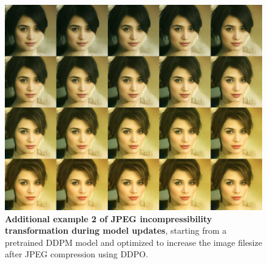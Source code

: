 \begin{appendixs}
        \begin{figure}
            \centering
            \includegraphics[scale=1.40]{img/results/incompressibility_28.png}
            \vspace{-0pt}  %
            \captionsetup{width=\textwidth} %
            \caption{\textbf{Additional example 2 of JPEG incompressibility transformation during model updates}, starting from a pretrained DDPM model and optimized to increase the image filesize after JPEG compression using DDPO.}
            \label{fig:ddpm-to-ddpo-incompressibility-extra2}
        \end{figure}


\end{appendixs}
